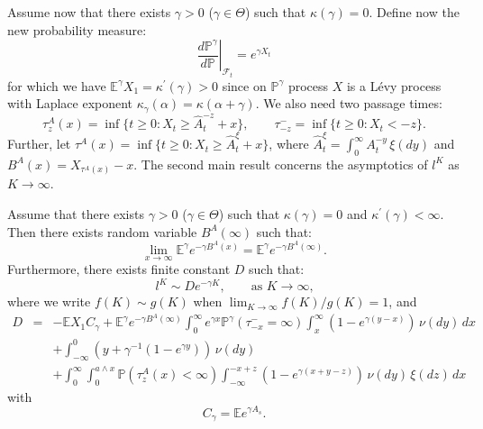 \documentclass{aptpub}
\begin{document}
Assume now that there exists $\gamma>0$ ($\gamma\in \Theta$) such that $\kappa(\gamma)=0$.
Define now the new probability measure:
$$\left. \frac{d\mathbb{P}^\gamma}{d\mathbb{P}}\right| _{\mathcal{F}_{t}}=e^{\gamma X_t}$$
for which we have $\mathbb{E}^\gamma X_1=\kappa^{'}(\gamma)>0$ since on $\mathbb{P}^\gamma$ process $X$ is a L\'{e}vy process
with Laplace exponent $\kappa_\gamma(\alpha)=\kappa(\alpha+\gamma)$.
We also need two passage times:
$$\tau^A_z(x)=\inf\{t\geq 0: X_t\geq \widehat{A}_t^{-z}+x\}, \qquad \tau_{-z}^-=\inf\{t\geq 0: X_t<-z\}.$$
Further, let $\tau^A(x)=\inf\{t\geq 0: X_t\geq \widehat{A}_t^{\xi}+x\}$, where
$\widehat{A}_t^{\xi}=\int_0^\infty A_t^{-y}\,\xi(dy)$
and $B^A(x)=X_{\tau^A(x)}-x$.
The second main result concerns the asymptotics of $l^K$ as $K\to\infty$.
\begin{thm}\label{mainas}
Assume that there exists $\gamma>0$ ($\gamma\in \Theta$) such that $\kappa(\gamma)=0$ and $\kappa^{'}(\gamma)<\infty$.
Then there exists random variable
$B^A(\infty)$ such that:
\begin{equation}\label{mainproblem}
\lim_{x\to\infty}\mathbb{E}^\gamma e^{-\gamma B^A(x)}=\mathbb{E}^\gamma e^{-\gamma B^A(\infty)}.\end{equation}
Furthermore, there exists finite constant $D$ such that:
\begin{equation}\label{Cramer}l^K\sim De^{-\gamma K},\qquad \mbox{as $K\to\infty$,}
 \end{equation}
 where we write $f(K)\sim g(K)$ when $\lim_{K\to\infty}f(K)/g(K)=1$, and
 \begin{eqnarray}
 D&=&-\mathbb{E}X_1C_\gamma+\mathbb{E}^\gamma e^{-\gamma B^A(\infty)}\int_0^\infty e^{\gamma x}\mathbb{P}^\gamma(\tau_{-x}^-=\infty)\int_x^\infty \left(1-e^{\gamma(y-x)}\right)\,\nu(dy)\,dx \nonumber\\
 &&+\int_{-\infty}^0\left(y+\gamma^{-1}\left(1-e^{\gamma y}\right)\right)\,\nu(dy)\nonumber\\&&
 +\int_0^\infty \int_0^{a\wedge x}\mathbb{P}(\tau^A_z(x)<\infty)\int_{-\infty}^{-x+z}\left(1-e^{\gamma(x+y-z)}\right)\,\nu(dy)\,\xi(dz)\,dx
\label{D}
 \end{eqnarray}
 with $$C_\gamma=\mathbb{E}e^{\gamma A_s}.$$
\end{thm}
\end{document}
